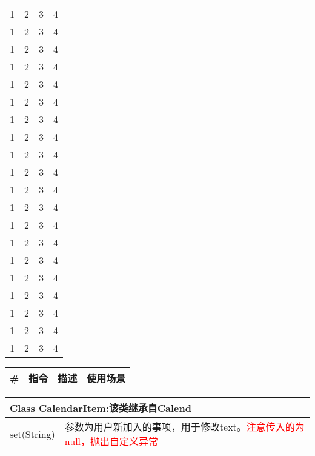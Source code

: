 \documentclass[UTF8,a4paper,12pt]{ctexart}%
\begin{document}
\begin{center}
\begin{longtable}{|c|c|c|c|}
		1 & 2 & 3 & 4 \\ 1 & 2 & 3 & 4 \\ 1 & 2 & 3 & 4 \\ 1 & 2 & 3 & 4 \\
		1 & 2 & 3 & 4 \\ 1 & 2 & 3 & 4 \\ 1 & 2 & 3 & 4 \\ 1 & 2 & 3 & 4 \\
		1 & 2 & 3 & 4 \\ 1 & 2 & 3 & 4 \\ 1 & 2 & 3 & 4 \\ 1 & 2 & 3 & 4 \\
		1 & 2 & 3 & 4 \\ 1 & 2 & 3 & 4 \\ 1 & 2 & 3 & 4 \\ 1 & 2 & 3 & 4 \\
		1 & 2 & 3 & 4 \\ 1 & 2 & 3 & 4 \\ 1 & 2 & 3 & 4 \\ 1 & 2 & 3 & 4 \\
	\end{longtable}
\end{center}

\begin{center}
	\begin{longtable}{|p{1cm}|p{2cm}|p{3cm}|p{4cm}|}
		\hline
		\#&指令&描述&使用场景\\ \hline \hline
		\endhead
	\end{longtable}
\end{center}

\begin{center}
	\begin{tabular}{|p{5cm}|p{6cm}|}
		\hline
		\multicolumn{2}{|p{11cm}|}{\textbf{Class  CalendarItem:}该类继承自Calend}\\ \hline
		set(String)& 参数为用户新加入的事项，用于修改text。\textcolor{red}{注意传入的为null，抛出自定义异常}\\ \hline
	\end{tabular}
\end{center}

\end{document}
